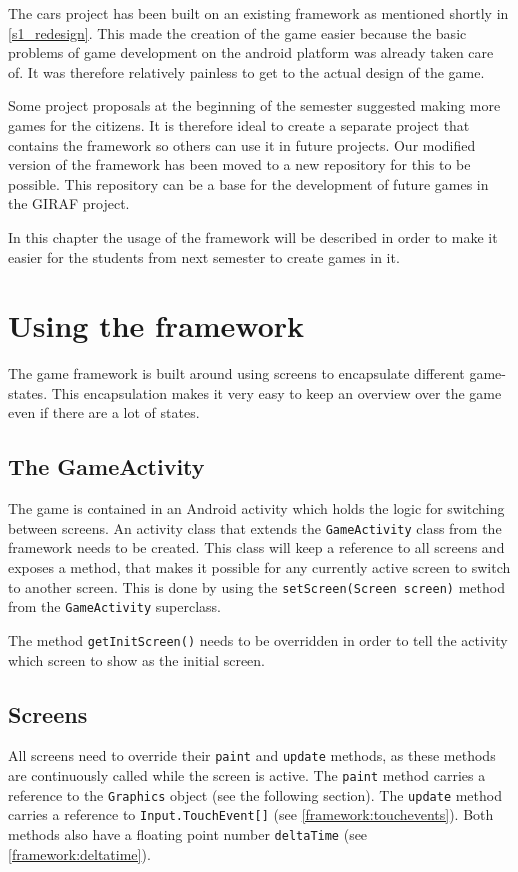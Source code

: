 The cars project has been built on an existing framework as mentioned shortly in \cref{s1_redesign}. 
This made the creation of the game easier because the basic problems of game development on the android platform was already taken care of.
It was therefore relatively painless to get to the actual design of the game. 

Some project proposals at the beginning of the semester suggested making more games for the citizens.
It is therefore ideal to create a separate project that contains the framework so others can use it in future projects.
Our modified version of the framework has been moved to a new repository for this to be possible.
This repository can be a base for the development of future games in the GIRAF project.

In this chapter the usage of the framework will be described in order to make it easier for the students from next semester to create games in it.

\section{Using the framework}
The game framework is built around using screens to encapsulate different game-states. 
This encapsulation makes it very easy to keep an overview over the game even if there are a lot of states.

\subsection{The GameActivity}
The game is contained in an Android activity which holds the logic for switching between screens.
An activity class that extends the \lstinline|GameActivity| class from the framework needs to be created.
This class will keep a reference to all screens and exposes a method, that makes it possible for any currently active screen to switch to another screen.
This is done by using the \lstinline|setScreen(Screen screen)| method from the \lstinline|GameActivity| superclass.

The method \lstinline|getInitScreen()| needs to be overridden in order to tell the activity which screen to show as the initial screen.

\subsection{Screens}
All screens need to override their \lstinline|paint| and \lstinline|update| methods, as these methods are continuously called while the screen is active.
The \lstinline|paint| method carries a reference to the \lstinline|Graphics| object (see the following section).
The \lstinline|update| method carries a reference to \lstinline|Input.TouchEvent[]| (see \cref{framework:touchevents}).
Both methods also have a floating point number \lstinline|deltaTime| (see \cref{framework:deltatime}).

